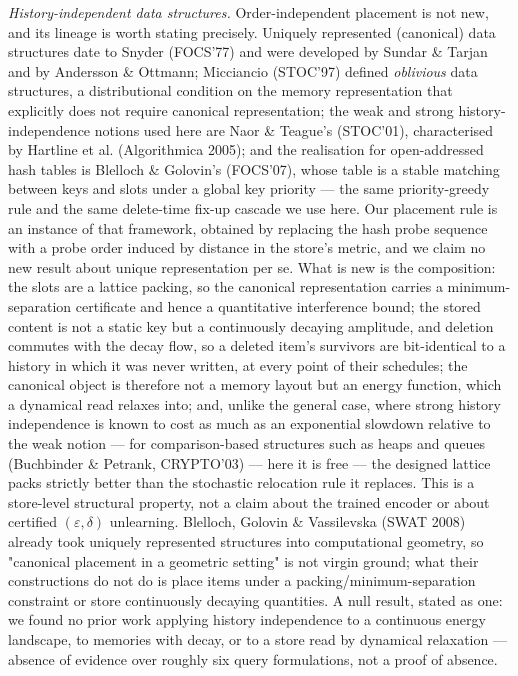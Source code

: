 \documentclass{article}
\begin{document}
\emph{History-independent data structures.} Order-independent placement is not new, and its lineage is worth stating precisely. Uniquely represented (canonical) data structures date to Snyder (FOCS'77) and were developed by Sundar \& Tarjan and by Andersson \& Ottmann; Micciancio (STOC'97) defined \emph{oblivious} data structures, a distributional condition on the memory representation that explicitly does not require canonical representation; the weak and strong history-independence notions used here are Naor \& Teague's (STOC'01), characterised by Hartline et al. (Algorithmica 2005); and the realisation for open-addressed hash tables is Blelloch \& Golovin's (FOCS'07), whose table is a stable matching between keys and slots under a global key priority --- the same priority-greedy rule and the same delete-time fix-up cascade we use here. Our placement rule is an instance of that framework, obtained by replacing the hash probe sequence with a probe order induced by distance in the store's metric, and we claim no new result about unique representation per se. What is new is the composition: the slots are a lattice packing, so the canonical representation carries a minimum-separation certificate and hence a quantitative interference bound; the stored content is not a static key but a continuously decaying amplitude, and deletion commutes with the decay flow, so a deleted item's survivors are bit-identical to a history in which it was never written, at every point of their schedules; the canonical object is therefore not a memory layout but an energy function, which a dynamical read relaxes into; and, unlike the general case, where strong history independence is known to cost as much as an exponential slowdown relative to the weak notion --- for comparison-based structures such as heaps and queues (Buchbinder \& Petrank, CRYPTO'03) --- here it is free --- the designed lattice packs strictly better than the stochastic relocation rule it replaces. This is a store-level structural property, not a claim about the trained encoder or about certified $(\varepsilon,\delta)$ unlearning. Blelloch, Golovin \& Vassilevska (SWAT 2008) already took uniquely represented structures into computational geometry, so "canonical placement in a geometric setting" is not virgin ground; what their constructions do not do is place items under a packing/minimum-separation constraint or store continuously decaying quantities. A null result, stated as one: we found no prior work applying history independence to a continuous energy landscape, to memories with decay, or to a store read by dynamical relaxation --- absence of evidence over roughly six query formulations, not a proof of absence.
\end{document}
